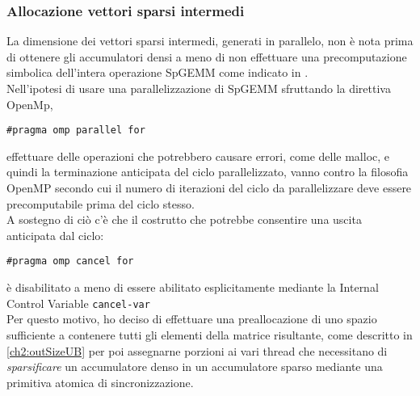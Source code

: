 \subsubsection{Allocazione vettori sparsi intermedi}
La dimensione dei vettori sparsi intermedi, generati in parallelo,
non è nota prima di ottenere gli accumulatori densi a meno di non effettuare 
una precomputazione simbolica dell'intera operazione SpGEMM come indicato in \parencite{sysReviewChi}.\\
Nell'ipotesi di usare una parallelizzazione di SpGEMM sfruttando la direttiva OpenMp,
\begin{lstlisting}[numbers=none]
#pragma omp parallel for 
\end{lstlisting} %
effettuare delle operazioni che potrebbero causare errori, come delle malloc,
e quindi la terminazione  anticipata del ciclo parallelizzato, 
vanno contro la filosofia OpenMP secondo cui il numero di iterazioni del ciclo
da parallelizzare deve essere precomputabile prima del ciclo stesso. \\ 
A sostegno di ciò c'è che il costrutto che potrebbe consentire una uscita anticipata dal ciclo:
\begin{lstlisting}[numbers=none]
#pragma omp cancel for 
\end{lstlisting} 
è disabilitato a meno di essere abilitato esplicitamente mediante la 
Internal Control Variable \verb|cancel-var | \parencite{openmp5.1}\\

Per questo motivo, ho deciso di effettuare una preallocazione di uno spazio
sufficiente a contenere tutti gli elementi \nnz della matrice risultante, come
descritto in \ref{ch2:outSizeUB} per poi assegnarne porzioni ai vari thread 
che necessitano di \emph{sparsificare} un accumulatore denso in un accumulatore 
sparso mediante una primitiva atomica di sincronizzazione.\\

